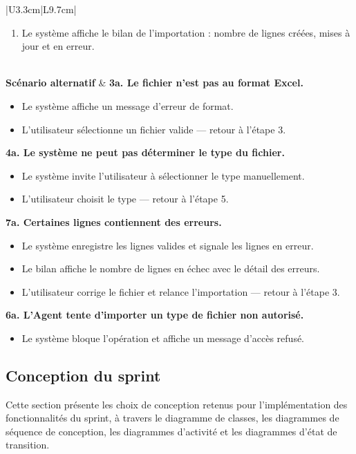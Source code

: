 \documentclass[a4paper,12pt]{report}
\begin{document}
\begin{longtable}{|U{3.3cm}|L{9.7cm}|}
\begin{enumerate}
\begin{itemize}
        ou supprimés selon le type.
    \end{itemize}
    \item Le système affiche le bilan de l'importation : nombre de
    lignes créées, mises à jour et en erreur.
\end{enumerate} \\
\hline
\textbf{Scénario alternatif} &
\textbf{3a. Le fichier n'est pas au format Excel.}
\begin{itemize}
    \item[3.1] Le système affiche un message d'erreur de format.
    \item[3.2] L'utilisateur sélectionne un fichier valide — retour à
    l'étape 3.
\end{itemize}
\textbf{4a. Le système ne peut pas déterminer le type du fichier.}
\begin{itemize}
    \item[4.1] Le système invite l'utilisateur à sélectionner le type
    manuellement.
    \item[4.2] L'utilisateur choisit le type — retour à l'étape 5.
\end{itemize}
\textbf{7a. Certaines lignes contiennent des erreurs.}
\begin{itemize}
    \item[7.1] Le système enregistre les lignes valides et signale les
    lignes en erreur.
    \item[7.2] Le bilan affiche le nombre de lignes en échec avec le
    détail des erreurs.
    \item[7.3] L'utilisateur corrige le fichier et relance l'importation
    — retour à l'étape 3.
\end{itemize}
\textbf{6a. L'Agent tente d'importer un type de fichier non autorisé.}
\begin{itemize}
    \item[6.1] Le système bloque l'opération et affiche un message
    d'accès refusé.
\end{itemize} 
\end{longtable}

\subsection{Conception du sprint}
 
Cette section présente les choix de conception retenus pour
l'implémentation des fonctionnalités du sprint, à travers le diagramme de classes, les
diagrammes de séquence de conception, les diagrammes d'activité et les
diagrammes d'état de transition.
\end{document}
